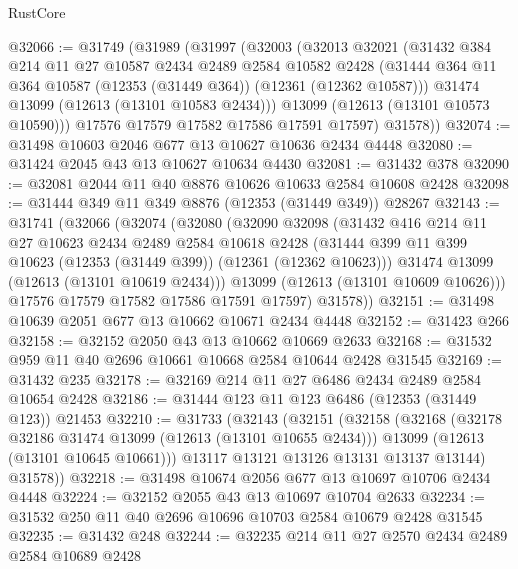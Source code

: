 \begin{lexlean}{RustCore}
\begin{coremodule}
@32066 := @31749
    (@31989
      (@31997
        (@32003
          (@32013
            @32021
            (@31432
              @384
              @214
              @11
              @27
              @10587
              @2434
              @2489
              @2584
              @10582
              @2428
              (@31444 @364 @11 @364 @10587 (@12353 (@31449 @364)) (@12361 (@12362 @10587)))
              @31474
              @13099
              (@12613 (@13101 @10583 @2434)))
            @13099
            (@12613 (@13101 @10573 @10590)))
          @17576
          @17579
          @17582
          @17586
          @17591
          @17597)
        @31578))
@32074 := @31498 @10603 @2046 @677 @13 @10627 @10636 @2434 @4448
@32080 := @31424 @2045 @43 @13 @10627 @10634 @4430
@32081 := @31432 @378
@32090 := @32081 @2044 @11 @40 @8876 @10626 @10633 @2584 @10608 @2428
@32098 := @31444 @349 @11 @349 @8876 (@12353 (@31449 @349)) @28267
@32143 := @31741
    (@32066
      (@32074
        (@32080
          (@32090
            @32098
            (@31432
              @416
              @214
              @11
              @27
              @10623
              @2434
              @2489
              @2584
              @10618
              @2428
              (@31444 @399 @11 @399 @10623 (@12353 (@31449 @399)) (@12361 (@12362 @10623)))
              @31474
              @13099
              (@12613 (@13101 @10619 @2434)))
            @13099
            (@12613 (@13101 @10609 @10626)))
          @17576
          @17579
          @17582
          @17586
          @17591
          @17597)
        @31578))
@32151 := @31498 @10639 @2051 @677 @13 @10662 @10671 @2434 @4448
@32152 := @31423 @266
@32158 := @32152 @2050 @43 @13 @10662 @10669 @2633
@32168 := @31532 @959 @11 @40 @2696 @10661 @10668 @2584 @10644 @2428 @31545
@32169 := @31432 @235
@32178 := @32169 @214 @11 @27 @6486 @2434 @2489 @2584 @10654 @2428
@32186 := @31444 @123 @11 @123 @6486 (@12353 (@31449 @123)) @21453
@32210 := @31733
    (@32143
      (@32151
        (@32158
          (@32168
            (@32178 @32186 @31474 @13099 (@12613 (@13101 @10655 @2434)))
            @13099
            (@12613 (@13101 @10645 @10661)))
          @13117
          @13121
          @13126
          @13131
          @13137
          @13144)
        @31578))
@32218 := @31498 @10674 @2056 @677 @13 @10697 @10706 @2434 @4448
@32224 := @32152 @2055 @43 @13 @10697 @10704 @2633
@32234 := @31532 @250 @11 @40 @2696 @10696 @10703 @2584 @10679 @2428 @31545
@32235 := @31432 @248
@32244 := @32235 @214 @11 @27 @2570 @2434 @2489 @2584 @10689 @2428

\end{coremodule}
\end{lexlean}
